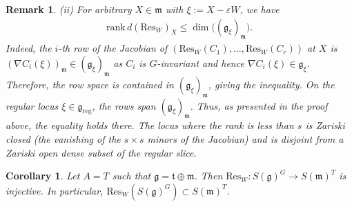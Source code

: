 \documentclass[11pt]{amsart}
\theoremstyle{definition}
\theoremstyle{plain}
\newtheorem{corollary}[theorem]{Corollary}
\newtheorem{remark}[theorem]{Remark}
\theoremstyle{conclusion}
\begin{document}
\begin{remark}
(ii) For arbitrary $X\in\mathfrak{m}$ with $\xi:=X-\varepsilon W$, we have  \begin{align*}
\mathrm{rank}\,d(\mathrm{Res}_W)_X \leq \dim\big((\mathfrak{g}_\xi)_{\mathfrak{m}}\big).
\end{align*} Indeed, the $i$-th row of the Jacobian of $(\mathrm{Res}_W(C_1),\ldots,\mathrm{Res}_W(C_r))$ at $X$ is $(\nabla C_i(\xi))_{\mathfrak{m}}\in(\mathfrak{g}_\xi)_{\mathfrak{m}}$ as $C_i$ is $G$-invariant and hence $\nabla C_i(\xi)\in\mathfrak{g}_\xi$. Therefore, the row space is contained in $(\mathfrak{g}_\xi)_{\mathfrak{m}}$, giving the inequality. On the regular locus $\xi\in\mathfrak{g}_{\mathrm{reg}}$, the rows span $(\mathfrak{g}_\xi)_{\mathfrak{m}}$. Thus, as presented in the proof above, the equality holds there. The locus where the rank is less than $s$ is Zariski closed (the vanishing of the $s\times s$ minors of the Jacobian) and is disjoint from a Zariski open dense subset of the regular slice.
 \end{remark}

 \begin{corollary}
    \label{coro:a=t} Let $A = T $ such that $\mathfrak{g} = \mathfrak{t} \oplus \mathfrak{m}$. Then $\mathrm{Res}_W: S(\mathfrak{g})^G \rightarrow S(\mathfrak{m})^T$ is injective. In particular, $\mathrm{Res}_W \left(S(\mathfrak{g})^G\right) \subset S(\mathfrak{m})^T$.
\end{corollary}
\end{document}
